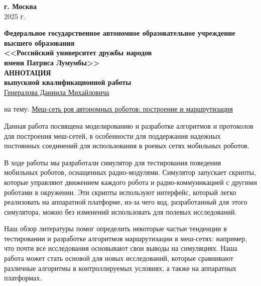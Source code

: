 \documentclass[%
]{report}
\begin{document}
\begin{titlepage}
  \begin{center} \textbf{г. Москва} \\ 2025 г. \end{center}
  \thispagestyle{empty} %
   
  \end{titlepage}
   \newpage

\renewcommand{\baselinestretch}{1.5}


\begin{center}
  \textbf{Федеральное государственное автономное образовательное учреждение высшего образования} \\
  \textbf{<<Российский университет дружбы народов}\\
  \textbf{имени Патриса Лумумбы>>}\\

  \large \textbf{АННОТАЦИЯ}\\
  \normalsize \textbf{выпускной квалификационной работы} \\

  \underline{Генералова Даниила Михайловича}
\end{center}

на тему: \uline{Меш-сеть роя автономных роботов: построение и маршрутизация}


Данная работа посвящена моделированию и разработке алгоритмов и протоколов
для построения меш-сетей, в особенности для поддержания надежных
постоянных соединений для
использования в роевых сетях мобильных роботов.

В ходе работы мы разработали симулятор для тестирования поведения мобильных роботов,
оснащенных радио-модулями.
Симулятор запускает скрипты, которые управляют движением каждого робота и
радио-коммуникацией с другими роботами в окружении.
Эти скрипты используют интерфейс,
который легко реализовать на аппаратной платформе,
из-за чего код, разработанный для этого симулятора,
можно без изменений использовать для полевых исследований.

Наш обзор литературы помог определить некоторые частые тенденции в тестировании
и разработке алгоритмов маршрутизации в меш-сетях:
например, что почти все исследования основывают свои выводы на симуляциях.
Наша работа может стать основой для новых исследований,
которые сравнивают различные алгоритмы в контроллируемых условиях,
а также на аппаратных платформах.

\vspace*{\fill}
\end{document}
